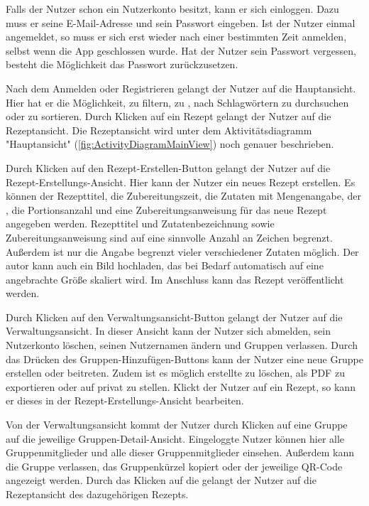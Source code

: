 \documentclass[parskip=full]{scrartcl}
\begin{document}
Falls der Nutzer schon ein Nutzerkonto besitzt, kann er sich einloggen.
Dazu muss er seine E-Mail-Adresse und sein Passwort eingeben. Ist der Nutzer einmal angemeldet, so muss er sich erst wieder nach einer bestimmten Zeit anmelden, selbst wenn die App geschlossen wurde.
Hat der Nutzer sein Passwort vergessen, besteht die Möglichkeit das Passwort zurückzusetzen.

Nach dem Anmelden oder Registrieren gelangt der Nutzer auf die Hauptansicht.
Hier hat er die Möglichkeit,  zu filtern, zu , nach Schlagwörtern zu durchsuchen oder zu sortieren.
Durch Klicken auf ein Rezept gelangt der Nutzer auf die Rezeptansicht.
Die Rezeptansicht wird unter dem Aktivitätsdiagramm "Hauptansicht" (\autoref{fig:ActivityDiagramMainView}) noch genauer beschrieben.

Durch Klicken auf den Rezept-Erstellen-Button gelangt der Nutzer auf die Rezept-Erstellungs-Ansicht.
Hier kann der Nutzer ein neues Rezept erstellen.
Es können der Rezepttitel, die Zubereitungszeit, die Zutaten mit Mengenangabe, der , die Portionsanzahl und eine
Zubereitungsanweisung für das neue Rezept angegeben werden. Rezepttitel und Zutatenbezeichnung sowie Zubereitungsanweisung sind auf eine sinnvolle Anzahl an Zeichen begrenzt. Außerdem ist nur die Angabe begrenzt vieler verschiedener Zutaten möglich. Der \gls{autor} kann auch ein Bild hochladen, das bei Bedarf automatisch auf eine angebrachte Größe skaliert wird. Im Anschluss kann das Rezept veröffentlicht werden.

Durch Klicken auf den Verwaltungsansicht-Button
gelangt der Nutzer auf die Verwaltungsansicht.
In dieser Ansicht kann der Nutzer sich abmelden, sein Nutzerkonto löschen, seinen Nutzernamen ändern und Gruppen verlassen. Durch das Drücken des Gruppen-Hinzufügen-Buttons kann der Nutzer eine neue Gruppe erstellen oder beitreten. Zudem ist es möglich erstellte  zu löschen, als PDF zu exportieren oder auf \gls{privat} zu stellen. Klickt der Nutzer auf ein Rezept, so kann er dieses in der Rezept-Erstellungs-Ansicht bearbeiten.

Von der Verwaltungsansicht kommt der Nutzer durch Klicken auf eine Gruppe auf die jeweilige Gruppen-Detail-Ansicht. Eingeloggte Nutzer können hier alle Gruppenmitglieder und alle  dieser Gruppenmitglieder einsehen. Außerdem kann die Gruppe verlassen, das Gruppenkürzel kopiert oder der jeweilige QR-Code angezeigt werden. Durch das Klicken auf die  gelangt der Nutzer auf die Rezeptansicht des dazugehörigen Rezepts.
\end{document}
